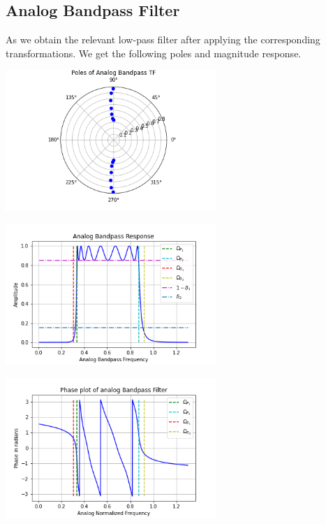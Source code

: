 \documentclass{scrartcl}
\begin{document}
\newpage

\subsection{Analog Bandpass Filter}

As we obtain the relevant low-pass filter after applying the corresponding transformations. We get the following poles and magnitude response.
\vspace{1cm}
\begin{center}
    \includegraphics[width=0.6\textwidth]{Graphics/Poles_bp.png}\par\vspace{0.2cm}
\end{center}

\begin{center}
    \includegraphics[width=0.6\textwidth]{Graphics/Bandpass.png}\par\vspace{0.2cm}
\end{center}

\begin{center}
    \includegraphics[width=0.6\textwidth]{Graphics/PhaseBP.png}\par\vspace{0.2cm}
\end{center}
\end{document}

